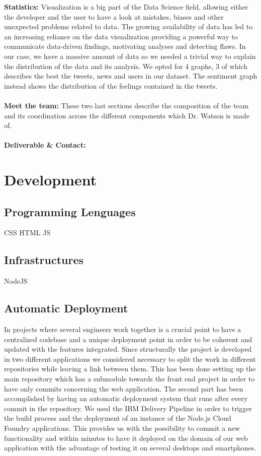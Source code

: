 \textbf{Statistics:}
Visualization is a big part of the Data Science field, allowing either the developer and the user to have a look at mistakes, biases and other unexpected problems related to data. The growing availability of data has led to an increasing reliance on the data visualization providing a powerful way to communicate data-driven findings, motivating analyses and detecting flaws. In our case, we have a massive amount of data so we needed a trivial way to explain the distribution of the data and its analysis.
We opted for 4 graphs, 3 of which describes the best the tweets, news and users in our dataset. The sentiment graph instead shows the distribution of the feelings contained in the tweets.\\~\\

\textbf{Meet the team:}
These two last sections describe the composition of the team and its coordination across the different components which Dr. Watson is made of.\\~\\

\textbf{Deliverable \& Contact:}

\section{Development}

\subsection{Programming Lenguages} 
CSS HTML JS

\subsection{Infrastructures} 
NodeJS

\subsection{Automatic Deployment} 
In projects where several engineers work together is a crucial point to have a centralized codebase and a unique deployment point in order to be coherent and updated with the features integrated.
Since structurally the project is developed in two different applications we considered necessary to split the work in different repositories while leaving a link between them. This has been done setting up the main repository which has a submodule towards the front end project in order to have only commits concerning the web application.
The second part has been accomplished by having an automatic deployment system that runs after every commit in the repository.
We used the IBM Delivery Pipeline in order to trigger the build process and the deployment of an instance of the Node.js Cloud Foundry applications.
This provides us with the possibility to commit a new functionality and within minutes to have it deployed on the domain of our web application with the advantage of testing it on several desktops and smartphones.

